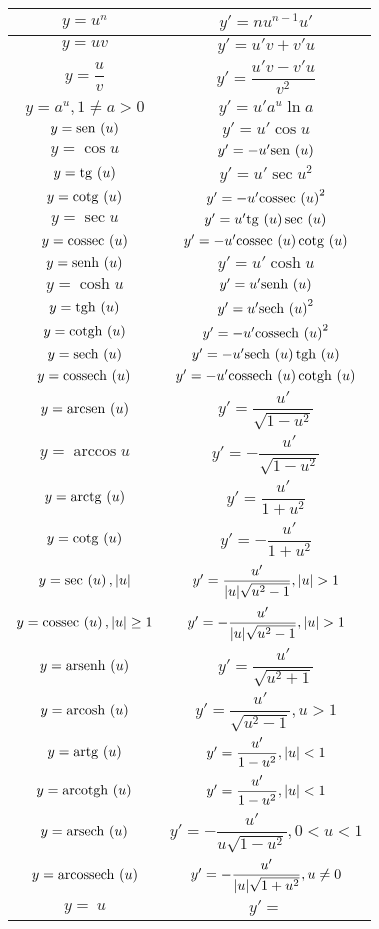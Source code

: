 \documentclass{article}
\begin{document}
    \begin{tabular}{|c|c|}
        \hline
        $y = u^n$                   &    $y' = nu^{n-1}u'$ \\ \hline
        $y = uv$                    &    $y' = u'v + v'u$ \\ \hline
        $y = \dfrac{u}{v}$          &    $y' = \dfrac{u'v - v'u}{v^2}$ \\ \hline
        $y = a^u, 1 \neq a > 0$     &    $y' = u'a^u \ln a$ \\ \hline
        $y = \mathrm{sen}\, \left( u \right)$                &    $y' = u' \cos u$ \\ \hline
        $y = \cos u$                &    $y' = -u' \mathrm{sen}\, \left( u \right)$ \\ \hline
        $y = \mathrm{tg}\,\left( u \right)$                 &    $y' = u' \sec u^2$ \\ \hline
        $y = \mathrm{cotg}\, \left( u \right)$               &    $y' = -u' \mathrm{cossec}\, \left( u \right)^2$ \\ \hline
        $y = \sec u$ &    $y' = u' \mathrm{tg}\,\left( u \right) \mathrm{sec}\, \left( u \right)$ \\ \hline
        $y = \mathrm{cossec}\, \left( u \right)$ &    $y' = -u' \mathrm{cossec}\, \left( u \right) \mathrm{cotg}\, \left( u \right)$ \\ \hline
        $y = \mathrm{senh}\, \left( u \right)$ &    $y' = u' \cosh u$ \\ \hline
        $y = \cosh u$ &    $y' = u' \mathrm{senh}\, \left( u \right)$ \\ \hline
        $y = \mathrm{tgh}\, \left( u \right)$ &    $y' = u' \mathrm{sech}\, \left( u \right)^2$ \\ \hline
        $y = \mathrm{cotgh}\, \left( u \right)$ &    $y' = -u' \mathrm{cossech}\, \left( u \right)^2$ \\ \hline
        $y = \mathrm{sech}\, \left( u \right)$ &    $y' = -u' \mathrm{sech}\, \left( u \right) \mathrm{tgh}\, \left( u \right)$ \\ \hline
        $y = \mathrm{cossech}\, \left( u \right)$ &    $y' = -u' \mathrm{cossech}\, \left( u \right) \mathrm{cotgh}\, \left( u \right)$ \\ \hline
        $y = \mathrm{arcsen}\, \left( u \right)$ &    $y' = \dfrac{u'}{\sqrt{1 - u^2}}$ \\ \hline
        $y = \arccos u$ &    $y' = - \dfrac{u'}{\sqrt{1 - u^2}}$ \\ \hline
        $y = \mathrm{arctg}\, \left( u \right)$ &    $y' = \dfrac{u'}{1+u^2}$ \\ \hline
        $y = \mathrm{cotg}\, \left( u \right)$ &    $y' = - \dfrac{u'}{1+u^2}$ \\ \hline
        $y = \mathrm{sec}\, \left( u \right), \lvert u \rvert$ &    $y' = \dfrac{u'}{\lvert u \rvert \sqrt{u^2 - 1}}, \lvert u \rvert > 1$ \\ \hline
        $y = \mathrm{cossec}\, \left( u \right), \lvert u \rvert \ge 1$ &    $y' = -\dfrac{u'}{\lvert u \rvert \sqrt{u^2 - 1}}, \lvert u \rvert > 1$ \\ \hline
        $y = \mathrm{arsenh}\, \left( u \right)$ &    $y' = \dfrac{u'}{\sqrt{u^2 + 1}}$ \\ \hline
        $y = \mathrm{arcosh}\, \left( u \right)$ &    $y' = \dfrac{u'}{\sqrt{u^2-1}}, u>1$ \\ \hline
        $y = \mathrm{artg}\, \left( u \right)$ &    $y' = \dfrac{u'}{1-u^2}, \lvert u \rvert < 1$ \\ \hline
        $y = \mathrm{arcotgh}\, \left( u \right)$ &    $y' = \dfrac{u'}{1 - u^2}, \lvert u \rvert < 1$ \\ \hline
        $y = \mathrm{arsech}\, \left( u \right)$ &    $y' = -\dfrac{u'}{u \sqrt{1 - u^2}}, 0 < u < 1$ \\ \hline
        $y = \mathrm{arcossech}\, \left( u \right)$ &    $y' = -\dfrac{u'}{\lvert u \rvert \sqrt{1 + u^2}}, u \neq 0$ \\ \hline
        $y = \ u$ &    $y' = $ \\ \hline
        \hline
    \end{tabular}
\end{document}
